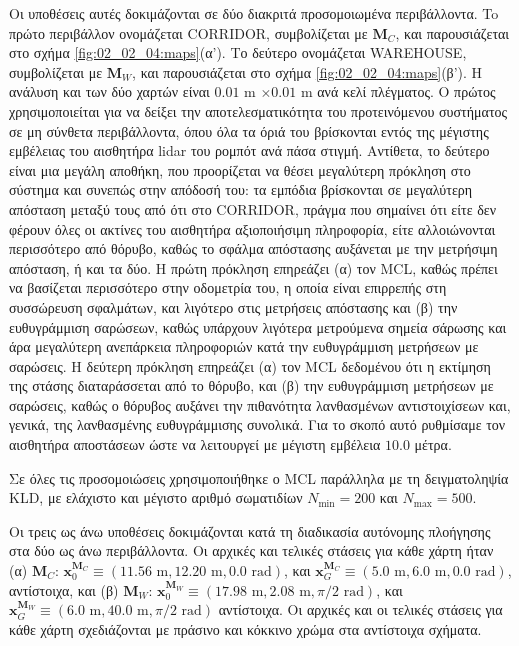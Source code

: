Οι υποθέσεις αυτές δοκιμάζονται σε δύο διακριτά προσομοιωμένα περιβάλλοντα. To
πρώτο περιβάλλον ονομάζεται CORRIDOR, συμβολίζεται με $\bm{M}_C$, και
παρουσιάζεται στο σχήμα \ref{fig:02_02_04:maps}(α'). Το δεύτερο ονομάζεται
WAREHOUSE, συμβολίζεται με $\bm{M}_W$, και παρουσιάζεται στο σχήμα
\ref{fig:02_02_04:maps}(β'). Η ανάλυση και των δύο χαρτών είναι $0.01$ m
$\times0.01$ m ανά κελί πλέγματος. Ο πρώτος χρησιμοποιείται για να δείξει την
αποτελεσματικότητα του προτεινόμενου συστήματος σε μη σύνθετα περιβάλλοντα,
όπου όλα τα όριά του βρίσκονται εντός της μέγιστης εμβέλειας του αισθητήρα
lidar του ρομπότ ανά πάσα στιγμή.  Αντίθετα, το δεύτερο είναι μια μεγάλη
αποθήκη, που προορίζεται να θέσει μεγαλύτερη πρόκληση στο σύστημα και συνεπώς
στην απόδοσή του: τα εμπόδια βρίσκονται σε μεγαλύτερη απόσταση μεταξύ τους από
ότι στο CORRIDOR, πράγμα που σημαίνει ότι είτε δεν φέρουν όλες οι ακτίνες του
αισθητήρα αξιοποιήσιμη πληροφορία, είτε αλλοιώνονται περισσότερο από θόρυβο,
καθώς το σφάλμα απόστασης αυξάνεται με την μετρήσιμη απόσταση, ή και τα δύο. Η
πρώτη πρόκληση επηρεάζει (α) τον MCL, καθώς πρέπει να βασίζεται περισσότερο
στην οδομετρία του, η οποία είναι επιρρεπής στη συσσώρευση σφαλμάτων, και
λιγότερο στις μετρήσεις απόστασης και (β) την ευθυγράμμιση σαρώσεων, καθώς
υπάρχουν λιγότερα μετρούμενα σημεία σάρωσης και άρα μεγαλύτερη ανεπάρκεια
πληροφοριών κατά την ευθυγράμμιση μετρήσεων με σαρώσεις. Η δεύτερη πρόκληση
επηρεάζει (α) τον MCL δεδομένου ότι η εκτίμηση της στάσης διαταράσσεται από το
θόρυβο, και (β) την ευθυγράμμιση μετρήσεων με σαρώσεις, καθώς ο θόρυβος αυξάνει
την πιθανότητα λανθασμένων αντιστοιχίσεων και, γενικά, της λανθασμένης
ευθυγράμμισης συνολικά. Για το σκοπό αυτό ρυθμίσαμε τον αισθητήρα αποστάσεων
ώστε να λειτουργεί με μέγιστη εμβέλεια $10.0$ μέτρα.

Σε όλες τις προσομοιώσεις χρησιμοποιήθηκε ο MCL παράλληλα με τη δειγματοληψία
KLD, με ελάχιστο και μέγιστο αριθμό σωματιδίων $N_{\min}=200$ και
$N_{\max}=500$.

Οι τρεις ως άνω υποθέσεις δοκιμάζονται κατά τη διαδικασία αυτόνομης πλοήγησης
στα δύο ως άνω περιβάλλοντα. Οι αρχικές και τελικές στάσεις για κάθε χάρτη ήταν
(α) $\bm{M}_C$:
$\bm{x}_0^{\bm{M}_C} \equiv (11.56\text{ m}, 12.20\text{ m}, 0.0 \text{ rad})$,
και $\bm{x}_G^{\bm{M}_C} \equiv (5.0 \text{ m}, 6.0 \text{ m}, 0.0 \text{ rad})$,
αντίστοιχα, και
(β) $\bm{M}_W$:
$\bm{x}_0^{\bm{M}_W} \equiv (17.98 \text{ m}, 2.08 \text{ m}, \pi/2 \text{ rad})$,
και $\bm{x}_G^{\bm{M}_W} \equiv (6.0 \text{ m}, 40.0 \text{ m}, \pi/2 \text{ rad})$
αντίστοιχα. Οι αρχικές και οι τελικές στάσεις για κάθε χάρτη σχεδιάζονται με
πράσινο και κόκκινο χρώμα στα αντίστοιχα σχήματα.

